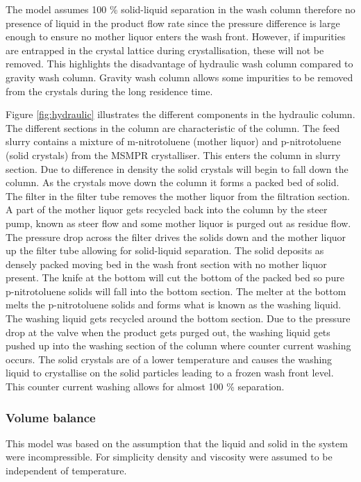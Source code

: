 The model assumes 100 \% solid-liquid separation in the wash column therefore no presence of liquid in the product flow rate since the pressure difference is large enough to ensure no mother liquor enters the wash front. However, if impurities are entrapped in the crystal lattice during crystallisation, these will not be removed. This highlights the disadvantage of hydraulic wash column compared to gravity wash column. Gravity wash column allows some impurities to be removed from the crystals during the long residence time. 

Figure \ref{fig:hydraulic} illustrates the different components in the hydraulic column. The different sections in the column are characteristic of the column. The feed slurry contains a mixture of m-nitrotoluene (mother liquor) and p-nitrotoluene (solid crystals) from the MSMPR crystalliser. This enters the column in slurry section. Due to difference in density the solid crystals will begin to fall down the column. As the crystals move down the column it forms a packed bed of solid. The filter in the filter tube removes the mother liquor from the filtration section. A part of the mother liquor gets recycled back into the column by the steer pump, known as steer flow and some mother liquor is purged out as residue flow. The pressure drop across the filter drives the solids down and the mother liquor up the filter tube allowing for solid-liquid separation. The solid deposits as densely packed moving bed in the wash front section with no mother liquor present. The knife at the bottom will cut the bottom of the packed bed so pure p-nitrotoluene solids will fall into the bottom section. The melter at the bottom melts the p-nitrotoluene solids and forms what is known as the washing liquid. The washing liquid gets recycled around the bottom section. Due to the pressure drop at the valve when the product gets purged out, the washing liquid gets pushed up into the washing section of the column where counter current washing occurs. The solid crystals are of a lower temperature and causes the washing liquid to crystallise on the solid particles leading to a frozen wash front level. This counter current washing allows for almost 100 \% separation. 

\subsubsection{Volume balance} 
This model was based on the assumption that the liquid and solid in the system were incompressible. For simplicity density and viscosity were assumed to be independent of temperature. 


